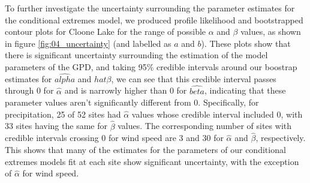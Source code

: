 \documentclass{article}
\numberwithin{equation}{section}
\begin{document}
To further investigate the uncertainty surrounding the parameter estimates for the conditional extremes model, we produced profile likelihood and bootstrapped contour plots for Cloone Lake for the range of possible $\alpha$ and $\beta$ values, as shown in figure \ref{fig:04_uncertainty} (and labelled as $a$ and $b$).
These plots show that there is significant uncertainty surrounding the estimation of the model parameters of the GPD, and taking 95\% credible intervals around our boostrap estimates for $\hat{alpha}$ and $hat{\beta}$, we can see that this credible interval passes through 0 for $\hat{\alpha}$ and is narrowly higher than 0 for $\hat{beta}$, indicating that these parameter values aren't significantly different from $0$. 
Specifically, for precipitation, 25 of 52 sites had $\hat{\alpha}$ values whose credible interval included 0, with 33 sites having the same for $\hat{\beta}$ values. 
The corresponding number of sites with credible intervals crossing 0 for wind speed are 3 and 30 for $\hat{\alpha}$ and $\hat{\beta}$, respectively.
This shows that many of the estimates for the parameters of our conditional extremes models fit at each site show significant uncertainty, with the exception of $\hat{\alpha}$ for wind speed.
\end{document}
